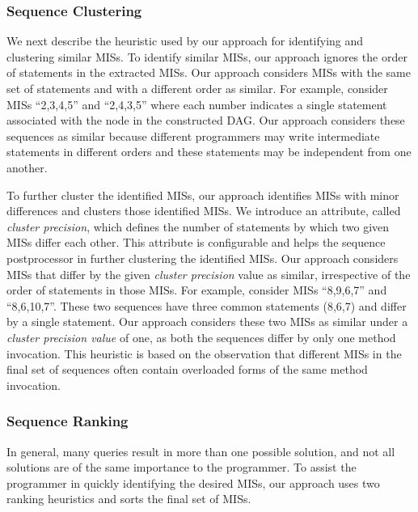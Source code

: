 \subsubsection{Sequence Clustering}
\label{sec:rankingCriteria}

We next describe the heuristic used
by our approach for identifying and clustering similar MISs.
To identify similar MISs, our approach ignores the order of statements in the
extracted MISs. Our approach considers MISs with the same set of
statements and with a different order as similar.
For example, consider MISs ``2,3,4,5'' and ``2,4,3,5'' where each
number indicates a single statement associated with the node
in the constructed DAG. Our approach considers
these sequences as similar because different programmers
may write intermediate statements in different orders and these
statements may be independent from one another.

To further cluster the identified MISs, 
our approach identifies MISs with minor differences and
clusters those identified MISs. We introduce an attribute,
called \emph{cluster precision}, which defines the number of statements by
which two given MISs differ each other. This attribute is
configurable and helps the sequence postprocessor in further 
clustering the identified MISs. Our approach considers
MISs that differ by the given \emph{cluster precision} value
as similar, irrespective of the order of statements in
those MISs. For example, consider MISs ``8,9,6,7'' and ``8,6,10,7''. These two
sequences have three common statements (8,6,7) and differ by a
single statement. Our approach considers these two MISs as similar
under a \emph{cluster precision value} of one, as both the sequences
differ by only one method invocation. This heuristic is based on the
observation that different MISs in the final set of sequences often
contain overloaded forms of the same method invocation.
\subsubsection{Sequence Ranking}
\label{sec:rankingCriteria}

In general, many queries result in more than one possible solution,
and not all solutions are of the same importance to the programmer.
To assist the programmer in quickly identifying the desired MISs,
our approach uses two ranking heuristics and sorts the final
set of MISs.

